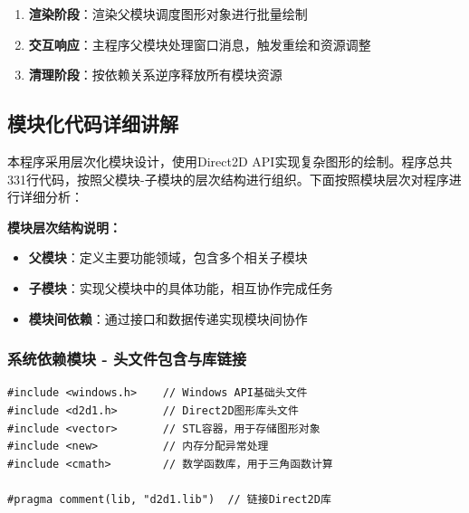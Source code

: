 \documentclass[12pt,a4paper]{article}
\begin{document}
\begin{tcolorbox}
\begin{enumerate}
\begin{enumerate}
        \item \textbf{第24个对象}：绘制从上部装饰结构到右侧分支的\textbf{斜向连接线}
    \end{enumerate}
    
    \textbf{绘制顺序设计原则：}
    \begin{itemize}
        \item \textbf{从主体到细节}：先绘制底部主圆形，再添加各部分细节
        \item \textbf{从内到外}：先构建核心结构，再扩展到外围元素
        \item \textbf{分区域绘制}：按照底部→中部→右侧→顶部的空间顺序组织
        \item \textbf{最后连接}：用连接线将各个独立部分有机结合
    \end{itemize}
    \item \textbf{渲染阶段}：渲染父模块调度图形对象进行批量绘制
    \item \textbf{交互响应}：主程序父模块处理窗口消息，触发重绘和资源调整
    \item \textbf{清理阶段}：按依赖关系逆序释放所有模块资源
\end{enumerate}

\end{tcolorbox}

\subsection{模块化代码详细讲解}

本程序采用层次化模块设计，使用Direct2D API实现复杂图形的绘制。程序总共331行代码，按照父模块-子模块的层次结构进行组织。下面按照模块层次对程序进行详细分析：

\textbf{模块层次结构说明：}
\begin{itemize}
    \item \textbf{父模块}：定义主要功能领域，包含多个相关子模块
    \item \textbf{子模块}：实现父模块中的具体功能，相互协作完成任务
    \item \textbf{模块间依赖}：通过接口和数据传递实现模块间协作
\end{itemize}

\subsubsection{系统依赖模块 - 头文件包含与库链接}

\begin{lstlisting}[caption=系统依赖声明]
#include <windows.h>    // Windows API基础头文件
#include <d2d1.h>       // Direct2D图形库头文件
#include <vector>       // STL容器，用于存储图形对象
#include <new>          // 内存分配异常处理
#include <cmath>        // 数学函数库，用于三角函数计算

#pragma comment(lib, "d2d1.lib")  // 链接Direct2D库
\end{lstlisting}
\end{document}
